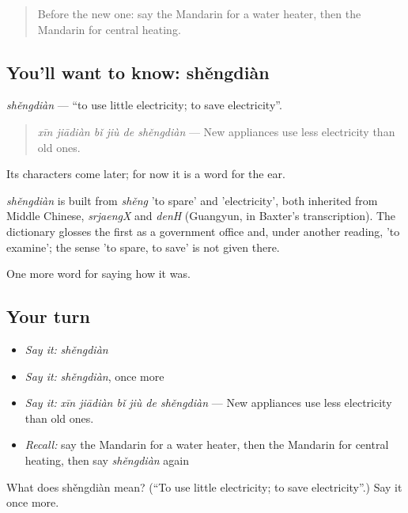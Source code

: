 \label{lesson:ZH-C520-shengdian}



\begin{quote}
Before the new one: say the Mandarin for a water heater, then the Mandarin for central heating.
\end{quote}

\subsection*{You'll want to know: shěngdiàn}
\emph{shěngdiàn} — \textquotedblleft{}to use little electricity; to save electricity\textquotedblright{}.

\begin{quote}
\emph{xīn jiādiàn bǐ jiù de shěngdiàn} — New appliances use less electricity than old ones.
\end{quote}

Its characters come later; for now it is a word for the ear.

\begin{cousinweb}
\emph{shěngdiàn} is built from \emph{shěng} 'to spare' and  'electricity', both inherited from Middle Chinese, \emph{srjaengX} and \emph{denH} (Guangyun, in Baxter's transcription). The dictionary glosses the first as a government office and, under another reading, 'to examine'; the sense 'to spare, to save' is not given there.
\end{cousinweb}

\begin{grammarlens}[title={What you've built}]
One more word for saying how it was.
\end{grammarlens}

\subsection*{Your turn}
\begin{itemize}
\raggedright
  \item \emph{Say it:} \emph{shěngdiàn}
  \item \emph{Say it:} \emph{shěngdiàn}, once more
  \item \emph{Say it:} \emph{xīn jiādiàn bǐ jiù de shěngdiàn} — New appliances use less electricity than old ones.
  \item \emph{Recall:} say the Mandarin for a water heater, then the Mandarin for central heating, then say \emph{shěngdiàn} again
\end{itemize}

\begin{tcolorbox}[breakable,colback=teal!4,colframe=teal!35!black,title={Before you move on}]
What does shěngdiàn mean? (\textquotedblleft{}To use little electricity; to save electricity\textquotedblright{}.) Say it once more.
\end{tcolorbox}
